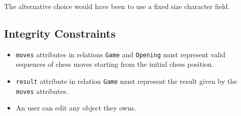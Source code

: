 \documentclass{article}
\begin{document}
The alternative choice would have been to use a fixed size character field.



\subsection{Integrity Constraints}
\begin{itemize}
\item \verb|moves| attributes in relations \verb|Game| and \verb|Opening| must represent
valid sequences of chess moves starting from the initial chess position.

\item \verb|result| attribute in relation \verb|Game| must represent the result given by the
\verb|moves| attributes.

\item An user can edit any object they owns.
\end{itemize}
\end{document}
